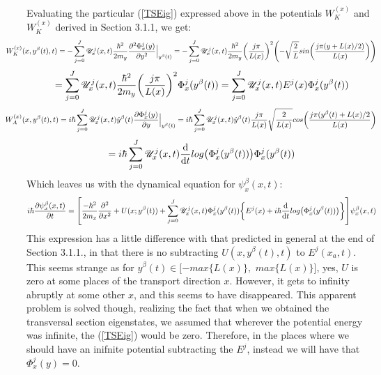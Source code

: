 \documentclass[11pt, a4paper]{article} %
\newcommand{\U}{\mathscr{U}}
\begin{document}
Evaluating the particular (\ref{TSEig}) expressed above in the potentials $W_K^{(x)}$ and $W_K^{(x)}$ derived in Section 3.1.1, we get:
$$
\hspace{-1cm} W_K^{(x)}(x,y^\beta(t),t)= -\sum_{j=0}^J \U^j_x(x,t)\frac{\hbar^2}{2m_y}\pdv[2]{\Phi^j_x(y)}{y}\Big\rvert_{y^\beta(t)} = -\sum_{j=0}^J \U^j_x(x,t)\frac{\hbar^2}{2m_y}\qty(\frac{j\pi}{L(x)})^2\qty(- \sqrt{\frac{2}{L}} sin\qty( \frac{j\pi (y+L(x)/2)}{L(x)} ))
$$
$$
=\sum_{j=0}^J  \U^j_x(x,t)\frac{\hbar^2}{2m_y}\qty(\frac{j\pi}{L(x)})^2 \Phi^j_x(y^\beta(t))= \sum_{j=0}^J  \U^j_x(x,t)E^j(x) \Phi^j_x(y^\beta(t))
$$
$$
\hspace{-1cm} W_A^{(x)}(x,y^\beta(t),t)=i\hbar\sum_{j=0}^J \U^j_x(x,t)\dot{y}^\beta(t)\pdv{\Phi^j_x(y)}{y}\Big\rvert_{y^\beta(t)}= i\hbar\sum_{j=0}^J \U^j_x(x,t)\dot{y}^\beta(t) \frac{j\pi}{L(x)} \sqrt{\frac{2}{L(x)}}cos\qty(\frac{j\pi (y^\beta(t)+L(x)/2}{L(x)})
$$
$$
=i\hbar \sum_{j=0}^J\U^j_x(x,t) \dv{}{t}log\qty(\Phi^j_x(y^\beta(t))) \Phi^j_x(y^\beta(t))
$$%
Which leaves us with the dynamical equation for $\psi^\beta_x(x,t)$:
$$
i\hbar \pdv{\psi^\beta_x(x,t)}{t}=\qty[ \frac{-\hbar^2}{2m_x}\pdv[2]{}{x} + U(x;y^\beta(t))+\sum_{j=0}^J \U^j_x(x,t)\Phi^j_x(y^\beta(t))\qty{ E^j(x)+i\hbar\dv{}{t}log\qty(\Phi^j_x(y^\beta(t)))} ]\psi^\beta_x(x,t)
$$
This expression has a little difference with that predicted in general at the end of Section 3.1.1., in that there is no subtracting $U(x,y^\beta(t),t)$ to $E^j(x_a,t)$. This seems strange as for $y^\beta(t)\in [-max\{L(x)\},$ $max\{L(x)\}]$, yes, $U$ is zero at some places of the transport direction $x$. However, it gets to infinity abruptly at some other $x$, and this seems to have disappeared. This apparent problem is solved though, realizing the fact that when we obtained the transversal section eigenstates, we assumed that wherever the potential energy was infinite, the (\ref{TSEig}) would be zero. Therefore, in the places where we should have an inifnite potential subtracting the $E^j$, instead we will have that $\Phi^j_x(y)=0$.
\end{document}
